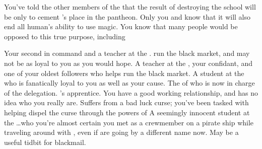 \documentclass[char]{GL2020}
\begin{document}
\begin{itemz}[Notes]
	\item You’ve told the other members of the \pGoaties{} that the result of destroying the school will be only to cement \cGenesis{}’s place in the pantheon. Only you and \cChupSecond{} know that it will also end all human’s ability to use magic. You know that many people would be opposed to this true purpose, including \cChupInventor{}
\end{itemz}

\begin{contacts}
	\contact{\cChupSecond{}} Your second in command and a teacher at the \pSc{}. \cChupSecond{\They} run\cChupSecond{\plural} the black market, and may not be as loyal to you as you would hope.
	\contact{\cChupInventor{}} A teacher at the \pSc{}, your confidant, and one of your oldest followers who helps run the black market.
	\contact{\cChupStudent{}} A student at the \pSc{} who is fanatically loyal to you as well as your cause.
	\contact{\cEbbPriest{}} The \cEbbPriest{\cleric} of \cEbb{} who is now in charge of the \pShip{} delegation.
	\contact{\cJuniorStatesman{}} \cHeadDiplomat{}’s apprentice. You have a good working relationship, and \cJuniorStatesman{} has no idea who you really are.
	\contact{\cInitiate{}} Suffers from a bad luck curse; you’ve been tasked with helping \cInitiate{\them} dispel the curse through the powers of \cGenesis{}
\contact{\cPirateChild{}} A seemingly innocent student at the \pSc{}\ldots who you’re almost certain you met as a crewmember on a pirate ship while traveling around with \cHeadDiplomat{}, even if \cPirateChild{\they} are going by a different name now. May be a useful tidbit for blackmail. 
\end{contacts}
\end{document}
